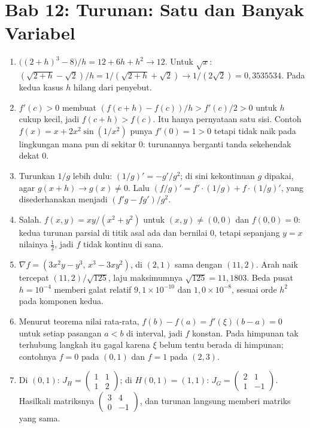 \section*{Bab 12: Turunan: Satu dan Banyak Variabel}
\begin{enumerate}[label=\textbf{12.\arabic*}]
  \item $\bigl((2+h)^{3}-8\bigr)/h=12+6h+h^{2}\to12$. Untuk $\sqrt x$:
        $(\sqrt{2+h}-\sqrt2)/h=1/(\sqrt{2+h}+\sqrt2)\to1/(2\sqrt2)
        =0{,}3535534$. Pada kedua kasus $h$ hilang dari penyebut.

  \item $f'(c)>0$ membuat $(f(c+h)-f(c))/h>f'(c)/2>0$ untuk $h$ cukup kecil,
        jadi $f(c+h)>f(c)$. Itu hanya pernyataan satu sisi. Contoh
        $f(x)=x+2x^{2}\sin(1/x^{2})$ punya $f'(0)=1>0$ tetapi tidak naik pada
        lingkungan mana pun di sekitar $0$: turunannya berganti tanda sekehendak
        dekat $0$.

  \item Turunkan $1/g$ lebih dulu: $(1/g)'=-g'/g^{2}$; di sini kekontinuan $g$
        dipakai, agar $g(x+h)\to g(x)\ne0$. Lalu
        $(f/g)'=f'\cdot(1/g)+f\cdot(1/g)'$, yang disederhanakan menjadi
        $(f'g-fg')/g^{2}$.

  \item Salah. $f(x,y)=xy/(x^{2}+y^{2})$ untuk $(x,y)\ne(0,0)$ dan
        $f(0,0)=0$: kedua turunan parsial di titik asal ada dan bernilai $0$,
        tetapi sepanjang $y=x$ nilainya $\tfrac12$, jadi $f$ tidak kontinu di
        sana.

  \item $\nabla f=(3x^{2}y-y^{3},\,x^{3}-3xy^{2})$, di $(2,1)$ sama dengan
        $(11,2)$. Arah naik tercepat $(11,2)/\sqrt{125}$, laju maksimumnya
        $\sqrt{125}=11{,}1803$. Beda pusat $h=10^{-4}$ memberi galat relatif
        $9{,}1\times10^{-10}$ dan $1{,}0\times10^{-8}$, sesuai orde $h^{2}$ pada
        komponen kedua.

  \item Menurut teorema nilai rata-rata,
        $f(b)-f(a)=f'(\xi)(b-a)=0$ untuk setiap pasangan $a<b$ di interval, jadi
        $f$ konstan. Pada himpunan tak terhubung langkah itu gagal karena $\xi$
        belum tentu berada di himpunan; contohnya $f=0$ pada $(0,1)$ dan $f=1$
        pada $(2,3)$.

  \item Di $(0,1)$: $J_{H}=\begin{pmatrix}1&1\\1&2\end{pmatrix}$; di
        $H(0,1)=(1,1)$: $J_{G}=\begin{pmatrix}2&1\\1&-1\end{pmatrix}$. Hasilkali
        matriksnya $\begin{pmatrix}3&4\\0&-1\end{pmatrix}$, dan turunan langsung
        memberi matriks yang sama.


\end{enumerate}
